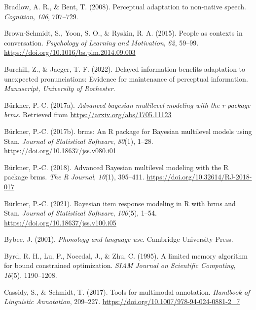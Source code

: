 \documentclass[
  11pt,
  english,
  man,floatsintext]{apa6}
\newlength{\cslhangindent}
\newlength{\cslentryspacingunit} %
\newenvironment{CSLReferences}[2] %
 {%
  \setlength{\parindent}{0pt}
  \ifodd #1
  \let\oldpar\par
  \def\par{\hangindent=\cslhangindent\oldpar}
  \fi
  \setlength{\parskip}{#2\cslentryspacingunit}
 }%
 {}
\begin{document}
\begin{CSLReferences}{1}{0}
\leavevmode{}%
Bradlow, A. R., \& Bent, T. (2008). Perceptual adaptation to non-native speech. \emph{Cognition}, \emph{106}, 707--729.

\leavevmode{}%
Brown-Schmidt, S., Yoon, S. O., \& Ryskin, R. A. (2015). People as contexts in conversation. \emph{Psychology of Learning and Motivation}, \emph{62}, 59--99. \url{https://doi.org/10.1016/bs.plm.2014.09.003}

\leavevmode{}%
Burchill, Z., \& Jaeger, T. F. (2022). Delayed information benefits adaptation to unexpected pronunciations: Evidence for maintenance of perceptual information. \emph{Manuscript, University of Rochester}.

\leavevmode{}%
Bürkner, P.-C. (2017a). \emph{Advanced bayesian multilevel modeling with the r package brms}. Retrieved from \url{https://arxiv.org/abs/1705.11123}

\leavevmode{}%
Bürkner, P.-C. (2017b). {brms}: An {R} package for {Bayesian} multilevel models using {Stan}. \emph{Journal of Statistical Software}, \emph{80}(1), 1--28. \url{https://doi.org/10.18637/jss.v080.i01}

\leavevmode{}%
Bürkner, P.-C. (2018). Advanced {Bayesian} multilevel modeling with the {R} package {brms}. \emph{The R Journal}, \emph{10}(1), 395--411. \url{https://doi.org/10.32614/RJ-2018-017}

\leavevmode{}%
Bürkner, P.-C. (2021). Bayesian item response modeling in {R} with {brms} and {Stan}. \emph{Journal of Statistical Software}, \emph{100}(5), 1--54. \url{https://doi.org/10.18637/jss.v100.i05}

\leavevmode{}%
Bybee, J. (2001). \emph{Phonology and language use}. Cambridge University Press.

\leavevmode{}%
Byrd, R. H., Lu, P., Nocedal, J., \& Zhu, C. (1995). A limited memory algorithm for bound constrained optimization. \emph{SIAM Journal on Scientific Computing}, \emph{16}(5), 1190--1208.

\leavevmode{}%
Cassidy, S., \& Schmidt, T. (2017). Tools for multimodal annotation. \emph{Handbook of Linguistic Annotation}, 209--227. \url{https://doi.org/10.1007/978-94-024-0881-2_7}


\end{CSLReferences}
\end{document}

